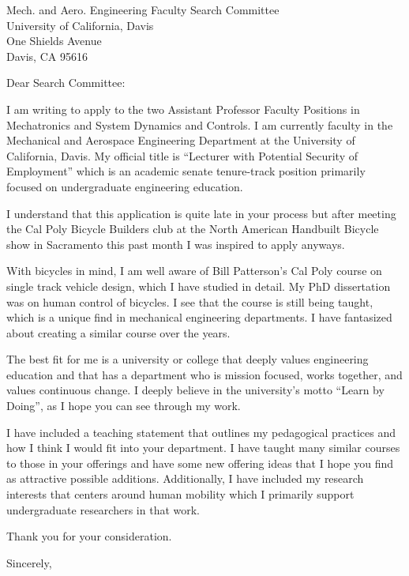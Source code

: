 \documentclass{letter}
\date{}
\begin{document}
\begin{letter}{
  Mech. and Aero. Engineering Faculty Search Committee \\
  University of California, Davis \\
  One Shields Avenue \\
  Davis, CA 95616}
\opening{Dear Search Committee:}

I am writing to apply to the two Assistant Professor Faculty Positions in
Mechatronics and System Dynamics and Controls. I am currently faculty in the
Mechanical and Aerospace Engineering Department at the University of
California, Davis. My official title is ``Lecturer with Potential Security of
Employment'' which is an academic senate tenure-track position primarily
focused on undergraduate engineering education.

I understand that this application is quite late in your process but after
meeting the Cal Poly Bicycle Builders club at the North American Handbuilt
Bicycle show in Sacramento this past month I was inspired to apply anyways.

With bicycles in mind, I am well aware of Bill Patterson's Cal Poly course on
single track vehicle design, which I have studied in detail. My PhD
dissertation was on human control of bicycles. I see that the course is still
being taught, which is a unique find in mechanical engineering departments. I
have fantasized about creating a similar course over the years.

The best fit for me is a university or college that deeply values engineering
education and that has a department who is mission focused, works together, and
values continuous change. I deeply believe in the university's motto ``Learn by
Doing'', as I hope you can see through my work.

I have included a teaching statement that outlines my pedagogical practices and
how I think I would fit into your department. I have taught many similar
courses to those in your offerings and have some new offering ideas that I hope
you find as attractive possible additions. Additionally, I have included my
research interests that centers around human mobility which I primarily support
undergraduate researchers in that work.

Thank you for your consideration.

\closing{Sincerely,}

\end{letter}
\end{document}
